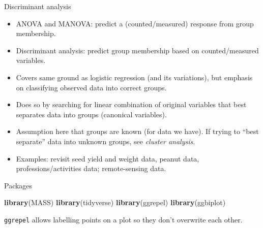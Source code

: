 \documentclass[
  ignorenonframetext,
]{beamer}
\newenvironment{Shaded}{\begin{snugshade}}{\end{snugshade}}
\newcommand{\KeywordTok}[1]{\textcolor[rgb]{0.13,0.29,0.53}{\textbf{#1}}}
\newcommand{\NormalTok}[1]{#1}
\begin{document}
\begin{frame}{Discriminant analysis}
\protect\hypertarget{discriminant-analysis-1}{}

\begin{itemize}
\item
  ANOVA and MANOVA: predict a (counted/measured) response from group
  membership.
\item
  Discriminant analysis: predict group membership based on
  counted/measured variables.
\item
  Covers same ground as logistic regression (and its variations), but
  emphasis on classifying observed data into correct groups.
\item
  Does so by searching for linear combination of original variables that
  best separates data into groups (canonical variables).
\item
  Assumption here that groups are known (for data we have). If trying to
  ``best separate'' data into unknown groups, see \emph{cluster
  analysis}.
\item
  Examples: revisit seed yield and weight data, peanut data,
  professions/activities data; remote-sensing data.
\end{itemize}

\end{frame}

\begin{frame}[fragile]{Packages}
\protect\hypertarget{packages-6}{}

\begin{Shaded}
\begin{Highlighting}[]
\KeywordTok{library}\NormalTok{(MASS)}
\KeywordTok{library}\NormalTok{(tidyverse)}
\KeywordTok{library}\NormalTok{(ggrepel)}
\KeywordTok{library}\NormalTok{(ggbiplot)}
\end{Highlighting}
\end{Shaded}

\texttt{ggrepel} allows labelling points on a plot so they don't
overwrite each other.

\end{frame}
\end{document}
